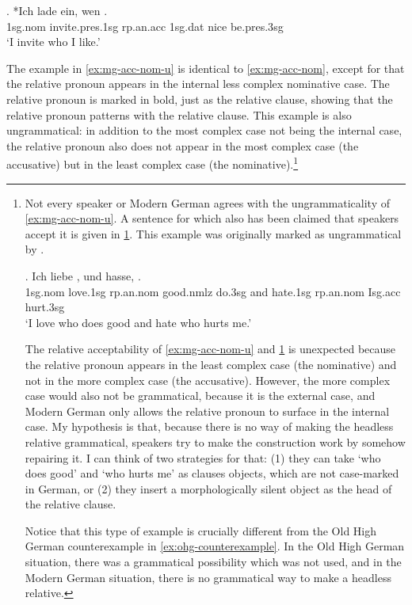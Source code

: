 \exg. *Ich {lade ein}, wen   .\\
1\ac{sg}.\ac{nom} invite.\ac{pres}.1\ac{sg}\scsub{[acc]} \ac{rp}.\ac{an}.\ac{acc} 1\ac{sg}.\ac{dat} nice be.\ac{pres}.3\ac{sg}\scsub{[nom]}\\
`I invite who I like.' \label{ex:mg-acc-nom}

The example in \ref{ex:mg-acc-nom-u} is identical to \ref{ex:mg-acc-nom}, except for that the relative pronoun appears in the internal less complex nominative case.
The relative pronoun is marked in bold, just as the relative clause, showing that the relative pronoun patterns with the relative clause.
This example is also ungrammatical: in addition to the most complex case not being the internal case, the relative pronoun also does not appear in the most complex case (the accusative) but in the least complex case (the nominative).\footnote{
Not every speaker or Modern German agrees with the ungrammaticality of \ref{ex:mg-acc-nom-u}. A sentence for which also has been claimed that speakers accept it is given in \ref{ex:mg-liebe-hasse}. This example was originally marked as ungrammatical by .

\exg. Ich liebe   , und hasse,   .\\
1\ac{sg}.\ac{nom} love.1\ac{sg}\scsub{[acc]} \ac{rp}.\ac{an}.\ac{nom} good.\ac{nmlz} do.3\ac{sg}\scsub{[nom]}
and hate.1\ac{sg}\scsub{[acc]} \ac{rp}.\ac{an}.\ac{nom} I\ac{sg}.\ac{acc} hurt.3\ac{sg}\scsub{[nom]}\\
`I love who does good and hate who hurts me.' \label{ex:mg-liebe-hasse}

The relative acceptability of \ref{ex:mg-acc-nom-u} and \ref{ex:mg-liebe-hasse} is unexpected because the relative pronoun appears in the least complex case (the nominative) and not in the more complex case (the accusative). However, the more complex case would also not be grammatical, because it is the external case, and Modern German only allows the relative pronoun to surface in the internal case. My hypothesis is that, because there is no way of making the headless relative grammatical, speakers try to make the construction work by somehow repairing it. I can think of two strategies for that: (1) they can take  `who does good' and  `who hurts me' as clauses objects, which are not case-marked in German, or (2) they insert a morphologically silent object as the head of the relative clause.

Notice that this type of example is crucially different from the Old High German counterexample in \ref{ex:ohg-counterexample}. In the Old High German situation, there was a grammatical possibility which was not used, and in the Modern German situation, there is no grammatical way to make a headless relative.
}

